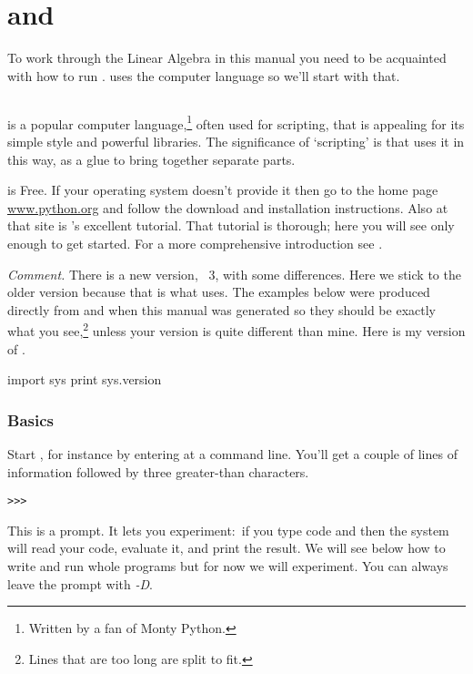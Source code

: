 \chapter{\python{} and \Sage{}}

To work through the Linear Algebra in this manual
you need to be acquainted with how to run \Sage. 
\Sage{} uses the computer language \python{} so we'll start with that.


\section{\python}
\python{} is a popular computer language,\footnote{Written by a fan of
Monty Python.} often used for scripting,
that is appealing for its simple style and powerful libraries.
The significance of `scripting' is that \Sage{} uses it in this way,
as a glue to bring together separate parts.

\python{} is Free.
If your operating system doesn't provide it then go to the home 
page \href{http://www.python.org}{\url{www.python.org}} and follow the
download and installation instructions.
Also at that site is \python's excellent tutorial.
That tutorial is thorough; 
here you will see only enough \python{} to get started.
For a more comprehensive introduction see \cite{PythonTeam12b}.

\smallskip
\textit{Comment.}
There is a new version, \python~3, with some differences.
Here we stick to the older version 
because that is what \Sage{} uses.
The examples below were produced directly 
from \python{} and \Sage{} when this manual was generated so they should be 
exactly what you see,\footnote{Lines that are too long are split to fit.} 
unless your version is quite different than mine.
Here is my version of \python. 
\begin{pythonoutput}
import sys
print sys.version
\end{pythonoutput}

\subsection{Basics}
Start \python, for instance by entering 
at a command line.
You'll get a couple of lines of 
information followed by three greater-than
characters.
\begin{lstlisting}[style=python]
>>>   
\end{lstlisting}
This is a prompt.
It lets you experiment:~if you type 
\python{} code and  then the system
will read your code, evaluate it, and print the result.
We will see below how to write and run whole programs
but for now we will experiment.
You can always leave the prompt with \textit{-D}.

